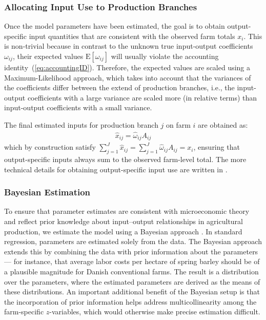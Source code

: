 \documentclass[12pt]{article}
\begin{document}
\subsubsection{Allocating Input Use to Production Branches}
\label{sec:allocating-input-use}
Once the model parameters have been estimated, the goal is to obtain
output-specific input quantities that are
consistent with the observed farm totals $x_i$.
This is non-trivial because in contrast to the unknown true input-output coefficients $\omega_{ij}$, their expected values $\text{E}[\omega_{ij}]$ will usually violate the accounting identity~(\ref{eq:accountingID}).
Therefore, the expected values are scaled using a Maximum-Likelihood approach, which takes into account that the variances of the coefficients differ between the extend of production branches, i.e., the input-output coefficients with a large variance are scaled more (in relative terms) than input-output coefficients with a small variance.

The final estimated inputs for production branch $j$ on farm $i$ are obtained as:
\begin{align}
    \hat{x}_{ij} = \hat{\omega}_{ij} A_{ij}
\end{align}
which by construction satisfy $\sum_{j=1}^J \hat{x}_{ij} = \sum_{j=1}^J \hat{\omega}_{ij} A_{ij}= x_i$,
ensuring that output-specific inputs always sum to the observed farm-level total.
The more technical details for obtaining output-specific input use are written in \cite{henningsen2026}.




\subsubsection{Bayesian Estimation}
To ensure that parameter estimates are consistent with microeconomic
theory and reflect prior knowledge about input--output relationships in
agricultural production, we estimate the model using a Bayesian
approach \citep{plastina2019,storm2016,ramsey2026}.
In standard regression, parameters are estimated solely from the data.
The Bayesian approach extends this by combining the data with prior
information about the parameters --- for instance, that average labor
costs per hectare of spring barley should be of a plausible magnitude
for Danish conventional farms.
The result is a distribution over the parameters, where the estimated parameters are derived as the means of these distributions.
An important additional benefit of the Bayesian setup is that the incorporation of prior information helps address multicollinearity among the farm-specific $z$-variables, which would otherwise make
precise estimation difficult.
\end{document}
